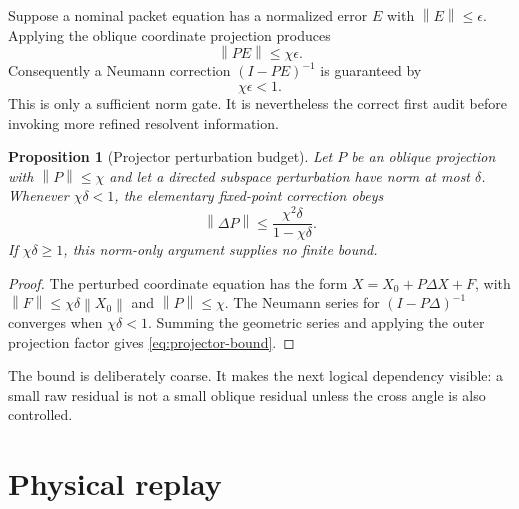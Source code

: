 \documentclass[12pt]{article}
\newtheorem{proposition}[theorem]{Proposition}
\theoremstyle{remark}
\newcommand{\norm}[1]{\left\lVert#1\right\rVert}
\begin{document}
Suppose a nominal packet equation has a normalized error $E$ with
$\norm E\le\epsilon$.  Applying the oblique coordinate projection produces
\begin{equation}\label{eq:transport}
 \norm{PE}\le\chi\epsilon.
\end{equation}
Consequently a Neumann correction $(I-PE)^{-1}$ is guaranteed by
\begin{equation}\label{eq:conditioned-gate}
 \chi\epsilon<1.
\end{equation}
This is only a sufficient norm gate.  It is nevertheless the correct first
audit before invoking more refined resolvent information.

\begin{proposition}[Projector perturbation budget]\label{prop:projector-perturb}
Let $P$ be an oblique projection with $\norm P\le\chi$ and let a directed
subspace perturbation have norm at most $\delta$.  Whenever
$\chi\delta<1$, the elementary fixed-point correction obeys
\begin{equation}\label{eq:projector-bound}
 \norm{\Delta P}
 \le \frac{\chi^2\delta}{1-\chi\delta}.
\end{equation}
If $\chi\delta\ge1$, this norm-only argument supplies no finite bound.
\end{proposition}

\begin{proof}
The perturbed coordinate equation has the form
$X=X_0+P\Delta X+F$, with $\norm F\le\chi\delta\norm{X_0}$ and
$\norm P\le\chi$.  The Neumann series for $(I-P\Delta)^{-1}$ converges when
$\chi\delta<1$.  Summing the geometric series and applying the outer
projection factor gives \eqref{eq:projector-bound}.
\end{proof}

The bound is deliberately coarse.  It makes the next logical dependency
visible: a small raw residual is not a small oblique residual unless the
cross angle is also controlled.

\section{Physical replay}
\end{document}
